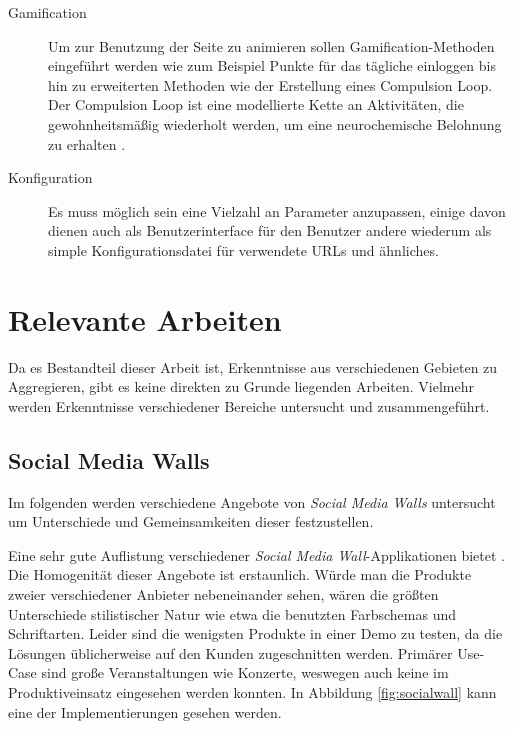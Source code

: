 \documentclass[12pt,twoside]{book}
\begin{document}
\begin{description}
\item[Gamification]
  Um zur Benutzung der Seite zu animieren sollen Gamification-Methoden eingeführt werden wie zum Beispiel Punkte für das tägliche einloggen bis hin zu erweiterten Methoden wie der Erstellung eines Compulsion Loop. Der Compulsion Loop ist eine modellierte Kette an Aktivitäten, die gewohnheitsmäßig wiederholt werden, um eine neurochemische Belohnung zu erhalten \cite{gamasutra}.

\item[Konfiguration]
  Es muss möglich sein eine Vielzahl an Parameter anzupassen, einige davon dienen auch als Benutzerinterface für den Benutzer andere wiederum als simple Konfigurationsdatei für verwendete URLs und ähnliches.

\end{description}

\section{Relevante Arbeiten}

Da es Bestandteil dieser Arbeit ist, Erkenntnisse aus verschiedenen Gebieten zu Aggregieren, gibt es keine direkten zu Grunde liegenden Arbeiten. Vielmehr werden Erkenntnisse verschiedener Bereiche untersucht und zusammengeführt.

\subsection{Social Media Walls}

Im folgenden werden verschiedene Angebote von \textit{Social Media Walls} untersucht um Unterschiede und Gemeinsamkeiten dieser festzustellen.

Eine sehr gute Auflistung verschiedener \textit{Social Media Wall}-Applikationen bietet \citep{hofram}. Die Homogenität dieser Angebote ist erstaunlich. Würde man die Produkte zweier verschiedener Anbieter nebeneinander sehen, wären die größten Unterschiede stilistischer Natur wie etwa die benutzten Farbschemas und Schriftarten. Leider sind die wenigsten Produkte in einer Demo zu testen, da die Lösungen üblicherweise auf den Kunden zugeschnitten werden. Primärer Use-Case sind große Veranstaltungen wie Konzerte, weswegen auch keine im Produktiveinsatz eingesehen werden konnten. In Abbildung \ref{fig:socialwall} kann eine der Implementierungen gesehen werden.\\
\end{document}
